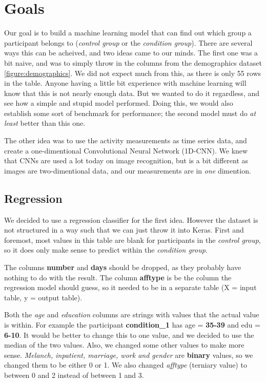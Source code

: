 \section{Goals}

Our goal is to build a machine learning model that can find out which group a participant belongs to (\textit{control group} or the \textit{condition group}).
There are several ways this can be acheived, and two ideas came to our minds. The first one was a bit naive, and was to simply throw in the columns from the 
demographics dataset \ref{figure:demographics}. We did not expect much from this, as there is only 55 rows in the table. Anyone having a little bit experience 
with machine learning will know that this is not nearly enough data. But we wanted to do it regardless, and see how a simple and stupid model performed.
Doing this, we would also establish some sort of benchmark for performance; the second model must do \textit{at least} better than this one.

The other idea was to use the activity measurements as time series data, and create a one-dimentional Convolutional Neural Network (1D-CNN). We knew that 
CNNs are used a lot today on image recognition, but is a bit different as images are two-dimentional data, and our measurements are in \textit{one} dimention.

\subsection{Regression}

We decided to use a regression classifier for the first idea. However the dataset is not structured in a way such that we can just throw it into Keras.
First and foremost, most values in this table are blank for participants in the \textit{control group}, so it does only make sense to predict within 
the \textit{condition group}. 

The columns \textbf{number} and \textbf{days} should be dropped, as they probably have nothing to do with the result. 
The column \textbf{afftype} is be the column the regression model should guess, so it needed to be in a separate table (X = input table, y = output table).

Both the \textit{age} and \textit{education} columns are strings with values that the actual value is within. For example the participant \textbf{condition\_1} 
has age = \textbf{35-39} and edu = \textbf{6-10}. It would be better to change this to one value, and we decided to use the median of the two values.
Also, we changed some other values to make more sense. \textit{Melanch, inpatient, marriage, work and gender} are \textbf{binary} values, 
so we changed them to be either 0 or 1. We also changed \textit{afftype} (terniary value) to between 0 and 2 instead of between 1 and 3.

